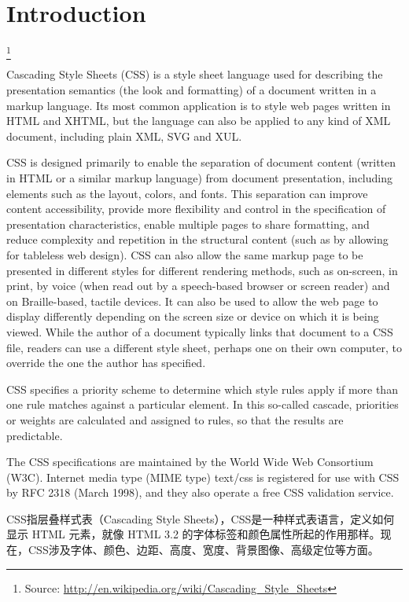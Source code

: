 \part{Introduction}\footnote{Source: \url{http://en.wikipedia.org/wiki/Cascading_Style_Sheets}}


Cascading Style Sheets (CSS) is a style sheet language used for describing the presentation semantics (the look and formatting) of a document written in a markup language. Its most common application is to style web pages written in HTML and XHTML, but the language can also be applied to any kind of XML document, including plain XML, SVG and XUL.

CSS is designed primarily to enable the separation of document content (written in HTML or a similar markup language) from document presentation, including elements such as the layout, colors, and fonts. This separation can improve content accessibility, provide more flexibility and control in the specification of presentation characteristics, enable multiple pages to share formatting, and reduce complexity and repetition in the structural content (such as by allowing for tableless web design). CSS can also allow the same markup page to be presented in different styles for different rendering methods, such as on-screen, in print, by voice (when read out by a speech-based browser or screen reader) and on Braille-based, tactile devices. It can also be used to allow the web page to display differently depending on the screen size or device on which it is being viewed. While the author of a document typically links that document to a CSS file, readers can use a different style sheet, perhaps one on their own computer, to override the one the author has specified.

CSS specifies a priority scheme to determine which style rules apply if more than one rule matches against a particular element. In this so-called cascade, priorities or weights are calculated and assigned to rules, so that the results are predictable.

The CSS specifications are maintained by the World Wide Web Consortium (W3C). Internet media type (MIME type) text/css is registered for use with CSS by RFC 2318 (March 1998), and they also operate a free CSS validation service.


CSS指层叠样式表（Cascading Style Sheets），CSS是一种样式表语言，定义如何显示 HTML 元素，就像 HTML 3.2 的字体标签和颜色属性所起的作用那样。现在，CSS涉及字体、颜色、边距、高度、宽度、背景图像、高级定位等方面。

